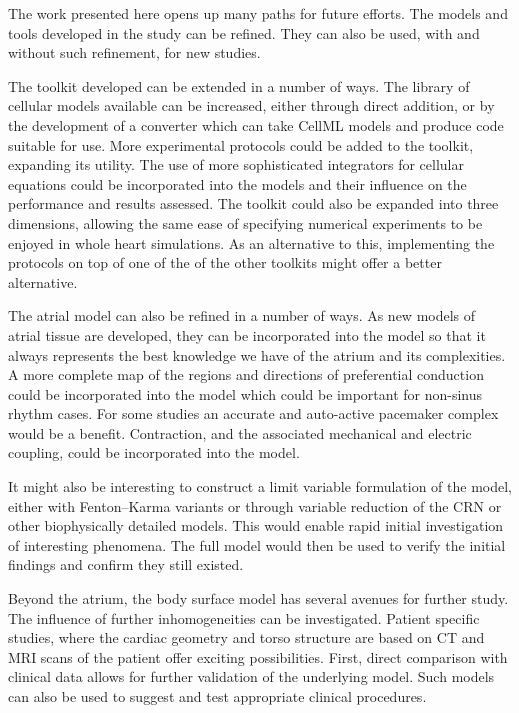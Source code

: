 The work presented here opens up many paths for future efforts.
The models and tools developed in the study can be refined.
They can also be used, with and without such refinement, for new studies.

The toolkit developed can be extended in a number of ways.
The library of cellular models available can be increased, either through
direct addition, or by the development of a converter which can take CellML
models and produce code suitable for use.
More experimental protocols could be added to the toolkit, expanding its
utility.
The use of more sophisticated integrators for cellular equations could be
incorporated into the models and their influence on the performance and results
assessed.
The toolkit could also be expanded into three dimensions, allowing the same ease
of specifying numerical experiments to be enjoyed in whole heart simulations.
As an alternative to this, implementing the protocols on top of one of the of
the other toolkits might offer a better alternative.

The atrial model can also be refined in a number of ways.
As new models of atrial tissue are developed, they can be incorporated into the
model so that it always represents the best knowledge we have of the atrium and
its complexities.
A more complete map of the regions and directions of preferential conduction
could be incorporated into the model which could be important for non-sinus
rhythm cases.
For some studies an accurate and auto-active pacemaker complex would be a
benefit.
Contraction, and the associated mechanical and electric coupling, could be
incorporated into the model.

It might also be interesting to construct a limit variable formulation of the
model, either with Fenton--Karma variants or through variable reduction of the
CRN or other biophysically detailed models.
This would enable rapid initial investigation of interesting phenomena.
The full model would then be used to verify the initial findings and confirm
they still existed.

Beyond the atrium, the body surface model has several avenues for further study.
The influence of further inhomogeneities can be investigated.
Patient specific studies, where the cardiac geometry and torso structure are
based on CT and MRI scans of the patient offer exciting possibilities.
First, direct comparison with clinical data allows for further validation of the
underlying model.
Such models can also be used to suggest and test appropriate clinical
procedures.

